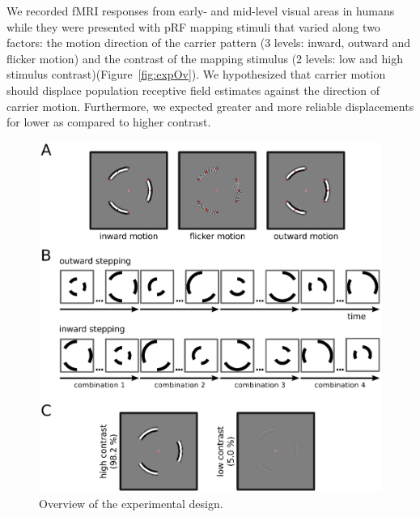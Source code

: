 We recorded fMRI responses from early- and mid-level visual areas in humans while they were presented with pRF mapping stimuli that varied along two factors: the motion direction of the carrier pattern (3 levels: inward, outward and flicker motion) and the contrast of the mapping stimulus (2 levels: low and high stimulus contrast)(Figure~\ref{fig:expOv}). We hypothesized that carrier motion should displace population receptive field estimates against the direction of carrier motion. Furthermore, we expected greater and more reliable displacements for lower as compared to higher contrast.

\begin{figure}[htb!]
\captionsetup{labelformat=simple}
\centering
\includegraphics[width=\textwidth]{figures/chapter_04/fig1.eps}
\caption{Overview of the experimental design.}
\end{figure}

